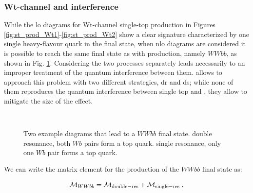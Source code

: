 \subsubsection*{Wt-channel and \ttbar interference}

While the \gls{lo} diagrams for Wt-channel single-top production in Figures \ref{fig:st_prod_Wt1}-\ref{fig:st_prod_Wt2} show a clear signature characterized by one single heavy-flavour quark in the final state,
when \gls{nlo} diagrams are considered it is possible to reach the same final state as with \ttbar production, namely $WWbb$, as shown in Fig. \ref{fig:WWbb_int}. 
Considering the two processes separately leads necessarily to an improper treatment of the quantum interference between them.
\PowhegBox allows to approach this problem with two different strategies, \gls{dr} and \gls{ds}; while none of them reproduces the quantum interference between single top and \ttbar, they allow to mitigate the size of the effect. 

\begin{figure}[h]
\centering 
{}$\;\;\;\;\;\;$
\caption{Two example diagrams that lead to a $WWbb$ final state.  double resonance, both $Wb$ pairs form a top quark.  single resonance, only one $Wb$ pair forms a top quark.}\label{fig:WWbb_int}
\end{figure}


We can write the matrix element for the production of the $WWbb$ final state as:

\begin{equation}
\mathcal{M}_{WWbb} = \mathcal{M}_{\rm{double-res}} + \mathcal{M}_{\rm{single-res}} \; ,
\end{equation}

